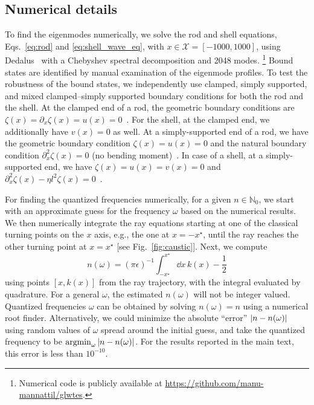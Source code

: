 \begin{subappendices}
\section{Numerical details}
\label{app:numerical}


To find the eigenmodes numerically, we solve the rod and shell equations, Eqs.~\eqref{eq:rod} and \eqref{eq:shell_wave_eq}, with $x \in \mathcal{X} = [-1000, 1000]$, using Dedalus~\cite{burns2020} with a Chebyshev spectral decomposition and 2048 modes.%
\footnote{Numerical code is publicly available at \url{https://github.com/manu-mannattil/glwtes}.}
Bound states are identified by manual examination of the eigenmode profiles.
To test the robustness of the bound states, we independently use clamped, simply supported, and mixed clamped--simply supported boundary conditions for both the rod and the shell.
At the clamped end of a rod, the geometric boundary conditions are $\zeta(x) = \partial_{x}\zeta(x) = u(x) = 0$~\cite{kernes2021}.
For the shell, at the clamped end, we additionally have $v(x) = 0$ as well.
At a simply-supported end of a rod, we have the geometric boundary condition $\zeta(x) = u(x) = 0$ and the natural boundary condition $\partial_{x}^{2}\zeta(x) = 0$ (no bending moment)~\cite{fung1965}.
In case of a shell, at a simply-supported end, we have $\zeta(x) = u(x) = v(x) = 0$ and $\partial_{x}^{2}\zeta(x) - \eta l^{2}\zeta(x) = 0$~\cite{yu1955}.


For finding the quantized frequencies numerically, for a given $n \in \mathbb{N}_{0}$, we start with an approximate guess for the frequency $\omega$ based on the numerical results.
We then numerically integrate the ray equations starting at one of the classical turning points on the $x$ axis, e.g., the one at $x = -x^{\star}$, until the ray reaches the other turning point at $x = x^{\star}$ [see Fig.~\ref{fig:caustic}].
Next, we compute
%
\begin{equation}
  n(\omega) = (\pi\epsilon)^{-1} \int_{-x^{\star}}^{x^{\star}} \dd{x}\,k(x) - \frac{1}{2}
\end{equation}
%
using points $\left[x, k(x)\right]$ from the ray trajectory, with the integral evaluated by quadrature.
For a general $\omega$, the estimated $n(\omega)$ will not be integer valued.
Quantized frequencies $\omega$ can be obtained by solving $n(\omega) = n$ using a numerical root finder.
Alternatively, we could minimize the absolute ``error'' $\lvert n - n(\omega)\rvert$ using random values of $\omega$ spread around the initial guess, and take the quantized frequency to be $\operatorname*{argmin}_{\omega}\,\lvert n - n(\omega)\rvert$.
For the results reported in the main text, this error is less than $10^{-10}$.

\end{subappendices}
